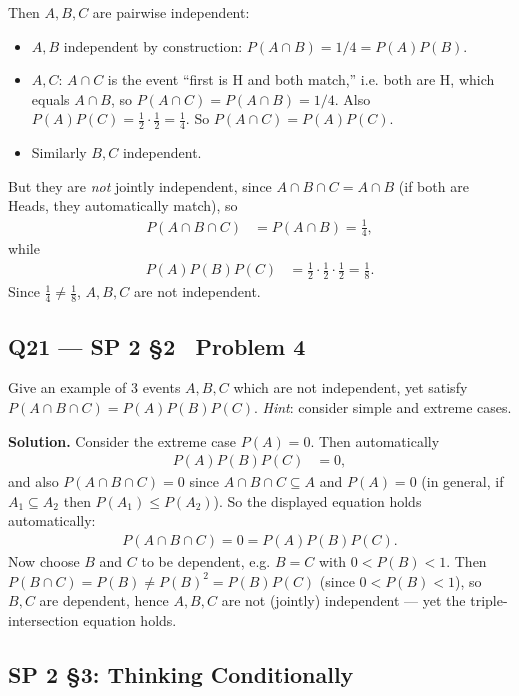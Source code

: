 \documentclass[11pt]{article}
\begin{document}
Then $A,B,C$ are pairwise independent:
\begin{itemize}
\item $A,B$ independent by construction: $P(A\cap B) = 1/4 = P(A)P(B)$.
\item $A,C$: $A\cap C$ is the event ``first is H and both match,'' i.e. both are H, which equals $A\cap B$, so $P(A\cap C) = P(A\cap B) = 1/4$. Also $P(A)P(C) = \tfrac12\cdot\tfrac12 = \tfrac14$. So $P(A\cap C)=P(A)P(C)$.
\item Similarly $B,C$ independent.
\end{itemize}
But they are \emph{not} jointly independent, since $A\cap B \cap C = A \cap B$ (if both are Heads, they automatically match), so
\begin{align*}
P(A\cap B\cap C) &= P(A\cap B) = \frac14,
\end{align*}
while
\begin{align*}
P(A)P(B)P(C) &= \frac12\cdot\frac12\cdot\frac12 = \frac18.
\end{align*}
Since $\tfrac14 \ne \tfrac18$, $A,B,C$ are not independent.

\subsection*{Q21 --- SP 2 \S2 \textperiodcentered\ Problem 4}
\begin{qbox}
Give an example of 3 events $A, B, C$ which are not independent, yet satisfy $P(A \cap B \cap C) = P(A)P(B)P(C)$. \textit{Hint}: consider simple and extreme cases.
\end{qbox}
\textbf{Solution.} Consider the extreme case $P(A) = 0$. Then automatically
\begin{align*}
P(A)P(B)P(C) &= 0,
\end{align*}
and also $P(A\cap B\cap C) = 0$ since $A\cap B\cap C \subseteq A$ and $P(A)=0$ (in general, if $A_1 \subseteq A_2$ then $P(A_1)\le P(A_2)$). So the displayed equation holds automatically:
\begin{align*}
P(A\cap B\cap C) = 0 = P(A)P(B)P(C).
\end{align*}
Now choose $B$ and $C$ to be dependent, e.g. $B=C$ with $0<P(B)<1$. Then $P(B\cap C) = P(B) \ne P(B)^2 = P(B)P(C)$ (since $0<P(B)<1$), so $B,C$ are dependent, hence $A,B,C$ are not (jointly) independent — yet the triple-intersection equation holds.

\subsection{SP 2 \S3: Thinking Conditionally}
\end{document}
